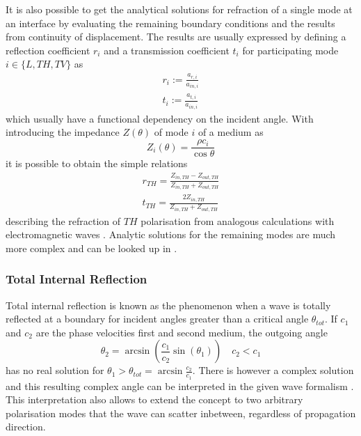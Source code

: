 
It is also possible to get the analytical solutions for refraction of a single
mode at an interface by evaluating the remaining boundary conditions and the
results from continuity of displacement. The results are usually expressed by
defining a reflection coefficient $r_i$ and a transmission coefficient $t_i$
for participating mode $i \in\{L, TH, TV\}$ as
\begin{align}
    r_i := \frac{a_{r,i}}{a_{in,i}} \\
    t_i := \frac{a_{t,i}}{a_{in,i}}
\end{align}
which usually have a functional dependency on the incident angle. With
introducing the impedance $Z(\theta)$ of mode $i$ of a medium as
\begin{equation}
    Z_i(\theta ) = \frac{\rho c_i}{\cos\theta}
\end{equation}
it is possible to obtain the simple relations
\begin{align}
    r_{TH} = \frac{Z_{in,TH}-Z_{out,TH}}{Z_{in,TH}+Z_{out,TH}} \\
    t_{TH} = \frac{2 Z_{in,TH}}{Z_{in,TH}+Z_{out,TH}}
\end{align}
describing the refraction of $TH$ polarisation from analogous calculations
with electromagnetic waves \cite[46,14]{brekhovskikh2012waves}. Analytic
solutions for the remaining modes are much more complex and can be looked up in
\cite[83]{ewing1957elastic}.

\subsubsection{Total Internal Reflection}
Total internal reflection is known as the phenomenon when a wave is totally
reflected at a boundary for incident angles greater than a critical angle
$\theta_{tot}$. If $c_1$ and $c_2$ are the phase velocities first and second
medium, the outgoing angle
\begin{equation}
    \theta_2 = \arcsin( \frac{c_1}{c_2} \sin(\theta_1)) \quad c_2 < c_1
\end{equation}
has no real solution for $\theta_1 > \theta_{tot} = \arcsin \frac{c_2}{c_1}$.
There is however a complex solution and this resulting complex angle can be
interpreted in the given wave formalism \cite[5]{brekhovskikh2012waves}. This
interpretation also allows to extend the concept to two arbitrary polarisation
modes that the wave can scatter inbetween, regardless of propagation direction.

